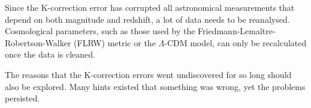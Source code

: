 \documentclass[linenumbers]{aastex631}
\begin{document}
Since the K-correction error has corrupted all astronomical measurements that
depend on both magnitude and redshift, a lot of data needs to be reanalysed.
Cosmological parameters, such as those used by the
Friedmann-Lema\^{i}tre-Robertson-Walker (FLRW) metric or the $\Lambda$-CDM
model, can only be recalculated once the data is cleaned.

The reasons that the K-correction errors went undiscovered for so long should
also be explored. Many hints existed that something was wrong, yet the
problems persisted.

{}

\end{document}
